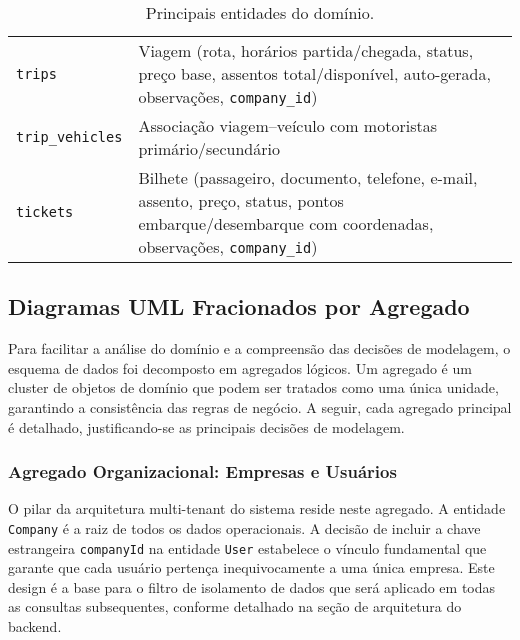 \begin{table}[H]
\begin{tabular}{p{3.5cm}p{11.5cm}}
    \texttt{trips}            & Viagem (rota, horários partida/chegada, status, preço base, assentos total/disponível, auto-gerada, observações, \texttt{company\_id})                                   \\
    \texttt{trip\_vehicles}   & Associação viagem–veículo com motoristas primário/secundário                                                                                                             \\
    \texttt{tickets}          & Bilhete (passageiro, documento, telefone, e-mail, assento, preço, status, pontos embarque/desembarque com coordenadas, observações, \texttt{company\_id})                \\
    \bottomrule
  \end{tabular}
  \caption{Principais entidades do domínio.}
  \label{tab:principais-entidades}
\end{table}

\subsection{Diagramas UML Fracionados por Agregado}

Para facilitar a análise do domínio e a compreensão das decisões de modelagem, o esquema de dados foi decomposto em agregados lógicos. Um agregado é um cluster de objetos de domínio que podem ser tratados como uma única unidade, garantindo a consistência das regras de negócio. A seguir, cada agregado principal é detalhado, justificando-se as principais decisões de modelagem.

\subsubsection*{Agregado Organizacional: Empresas e Usuários}

O pilar da arquitetura multi-tenant do sistema reside neste agregado. A entidade \texttt{Company} é a raiz de todos os dados operacionais. A decisão de incluir a chave estrangeira \texttt{companyId} na entidade \texttt{User} estabelece o vínculo fundamental que garante que cada usuário pertença inequivocamente a uma única empresa. Este design é a base para o filtro de isolamento de dados que será aplicado em todas as consultas subsequentes, conforme detalhado na seção de arquitetura do backend.

